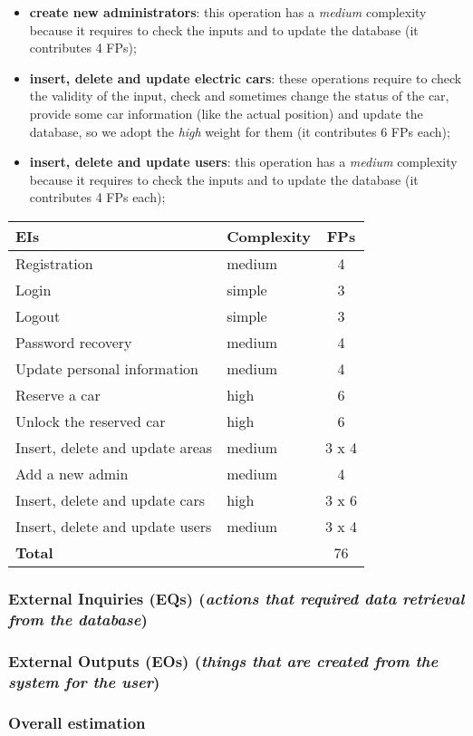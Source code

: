 \begin{itemize}
\begin{itemize}
			\item \textbf{create new administrators}: this operation has a \textit{medium} complexity because it requires to check the inputs and to update the database (it contributes 4 FPs);
			\item \textbf{insert, delete and update electric cars}: these operations require to check the validity of the input, check and sometimes change the status of the car, provide some car information (like the actual position) and update the database, so we adopt the \textit{high} weight for them (it contributes 6 FPs each);
			\item \textbf{insert, delete and update users}: this operation has a \textit{medium} complexity because it requires to check the inputs and to update the database (it contributes 4 FPs each);
		\end{itemize}
\end{itemize}

\begin{center}
	\begin{tabular}{|l|l|c|}
		\hline
		\textbf{EIs} 	& \textbf{Complexity} 	& \textbf{FPs} \\
		\hline
		Registration 	& medium 	& 4 \\
		Login 	& simple 	& 3 \\
		Logout 	& simple 	& 3 \\
		Password recovery 	& medium 	& 4 \\
		Update personal information 	& medium 	& 4 \\
		Reserve a car 	& high 	& 6 \\
		Unlock the reserved car 	& high 	& 6 \\
		Insert, delete and update areas 	& medium 	& 3 x 4 \\
		Add a new admin 	& medium 	& 4 \\
		Insert, delete and update cars 	& high 	& 3 x 6 \\
		Insert, delete and update users 	& medium 	& 3 x 4 \\		
		\hline \hline
		\textbf{Total} 	& 	& 76 \\
		\hline
	\end{tabular}
\end{center}

\subsubsection{External Inquiries (EQs) (\textit{actions that required data retrieval from the database})}

	\todo{}

\subsubsection{External Outputs (EOs) (\textit{things that are created from the system for the user})}

	\todo{}

\subsubsection{Overall estimation}

	\todo{}
